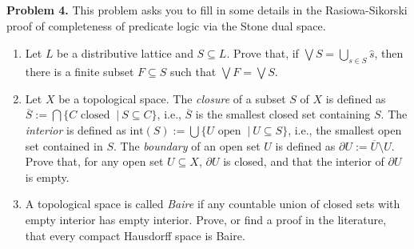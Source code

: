 \newpage

{\bf Problem 4.} This problem asks you to fill in some details in the Rasiowa-Sikorski proof of completeness of predicate logic via the Stone dual space.

\begin{enumerate}
\item Let $L$ be a distributive lattice and $S \subseteq L$. Prove that, if $\widehat{\bigvee S} = \bigcup_{s \in S} \widehat{s}$, then there is a finite subset $F \subseteq S$ such that $\bigvee F = \bigvee S$.

\item Let $X$ be a topological space. The \emph{closure} of a subset $S$ of $X$ is defined as $\overline{S} := \bigcap \{ C \text{ closed }  \ | \ S \subseteq C\}$, i.e., $\overline{S}$ is the smallest closed set containing $S$. The \emph{interior} is defined as $\mathrm{int}(S) :=\bigcup \{ U \text{ open } \ | \ U \subseteq S\}$, i.e., the smallest open set contained in $S$. The \emph{boundary} of an open set $U$ is defined as $\partial U := \overline{U} \setminus U$. Prove that, for any open set $U \subseteq X$, $\partial U$ is closed, and that the interior of $\partial U$ is empty.

\item A topological space is called \emph{Baire} if any countable union of closed sets with empty interior has empty interior. Prove, or find a proof in the literature, that every compact Hausdorff space is Baire.

\end{enumerate}
